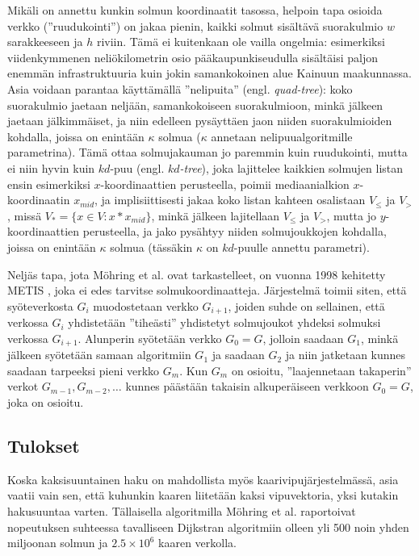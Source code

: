 \documentclass[finnish]{tktltiki2}
\theoremstyle{definition}
\theoremstyle{remark}
\begin{document}
 Mikäli on annettu kunkin solmun koordinaatit tasossa, helpoin tapa osioida verkko (''ruudukointi'') on jakaa pienin, kaikki solmut sisältävä suorakulmio $w$ sarakkeeseen ja $h$ riviin. Tämä ei kuitenkaan ole vailla ongelmia: esimerkiksi viidenkymmenen neliökilometrin osio pääkaupunkiseudulla sisältäisi paljon enemmän infrastruktuuria kuin jokin samankokoinen alue Kainuun maakunnassa. Asia voidaan parantaa käyttämällä ''nelipuita'' (engl. \textit{quad-tree}): koko suorakulmio jaetaan neljään, samankokoiseen suorakulmioon, minkä jälkeen jaetaan jälkimmäiset, ja niin edelleen pysäyttäen jaon niiden suorakulmioiden kohdalla, joissa on enintään $\kappa$ solmua ($\kappa$ annetaan nelipuualgoritmille parametrina). Tämä ottaa solmujakauman jo paremmin kuin ruudukointi, mutta ei niin hyvin kuin $kd$-puu (engl. \textit{$kd$-tree}), joka lajittelee kaikkien solmujen listan ensin esimerkiksi $x$-koordinaattien perusteella, poimii mediaanialkion $x$-koordinaatin $x_{mid}$, ja implisiittisesti jakaa koko listan kahteen osalistaan $V_{\leq}$ ja $V_{>}$, missä $V_{\ast} = \{ x \in V \colon x \ast x_{mid}\}$, minkä jälkeen lajitellaan $V_{\leq}$ ja $V_{>}$, mutta jo $y$-koordinaattien perusteella, ja jako pysähtyy niiden solmujoukkojen kohdalla, joissa on enintään $\kappa$ solmua (tässäkin $\kappa$ on $kd$-puulle annettu parametri).
 
 Neljäs tapa, jota Möhring et al. ovat tarkastelleet, on vuonna 1998 kehitetty METIS \cite{Karypis98}, joka ei edes tarvitse solmukoordinaatteja. Järjestelmä toimii siten, että syöteverkosta $G_i$ muodostetaan verkko $G_{i + 1}$, joiden suhde on sellainen, että verkossa $G_i$ yhdistetään ''tiheästi'' yhdistetyt solmujoukot yhdeksi solmuksi verkossa $G_{i + 1}$. Alunperin syötetään verkko $G_0 = G$, jolloin saadaan $G_1$, minkä jälkeen syötetään samaan algoritmiin $G_1$ ja saadaan $G_2$ ja niin jatketaan kunnes saadaan tarpeeksi pieni verkko $G_m$. Kun $G_m$ on osioitu, ''laajennetaan takaperin'' verkot $G_{m - 1}, G_{m - 2}, \dots$ kunnes päästään takaisin alkuperäiseen verkkoon $G_0 = G$, joka on osioitu.
 
\subsection{Tulokset}
Koska kaksisuuntainen haku on mahdollista myös kaarivipujärjestelmässä, asia vaatii vain sen, että kuhunkin kaaren liitetään kaksi vipuvektoria, yksi kutakin hakusuuntaa varten. Tällaisella algoritmilla Möhring et al. raportoivat nopeutuksen suhteessa tavalliseen Dijkstran algoritmiin olleen yli 500 noin yhden miljoonan solmun ja $2.5 \times 10^6$ kaaren verkolla.
 
\end{document}
